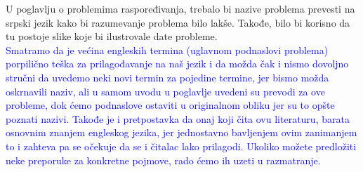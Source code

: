 \documentclass[a4paper]{report}
\newcommand{\odgovor}[1]{\textcolor{blue}{#1}}
\begin{document}
U poglavlju o problemima raspoređivanja, trebalo bi nazive problema prevesti na srpski jezik kako bi razumevanje problema bilo lakše. Takođe, bilo bi korisno da tu postoje slike koje bi ilustrovale date probleme.\\
\odgovor{Smatramo da je većina engleskih termina (uglavnom podnaslovi problema) porpilično teška za prilagođavanje na naš jezik i da možda čak i nismo dovoljno stručni da uvedemo neki novi termin za pojedine termine, jer bismo možda oskrnavili naziv, ali u samom uvodu u poglavlje uvedeni su prevodi za ove probleme, dok ćemo podnaslove ostaviti u originalnom obliku jer su to opšte poznati nazivi. Takođe je i pretpostavka da onaj koji čita ovu literaturu, barata osnovnim znanjem engleskog jezika, jer jednostavno bavljenjem ovim zanimanjem to i zahteva pa se očekuje da se i čitalac lako prilagodi. Ukoliko možete predložiti neke preporuke za konkretne pojmove, rado ćemo ih uzeti u razmatranje.\\}
\end{document}
